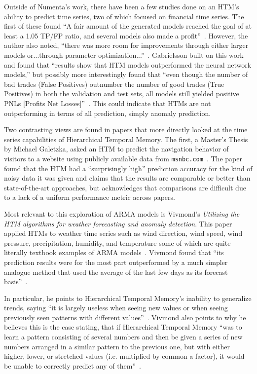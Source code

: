 \documentclass[oneside,12pt,openany]{book}
\begin{document}
	Outside of Numenta's work, there have been a few studies done on an HTM's ability to predict time series, two of which focused on financial time series. The first of these found ``A fair amount of the generated models reached the goal of at least a 1.05 TP/FP ratio, and several models also made a profit''~\cite{Evaluation}. However, the author also noted, ``there was more room for improvements through either larger models or...through parameter optimization...''~\cite{Evaluation}. Gabrielsson built on this work and found that ``results show that HTM models outperformed the neural network models,'' but possibly more interestingly found that ``even though the number of bad trades (False Positives) outnumber the number of good trades (True Positives) in both the validation and test sets, all models still yielded positive PNLs [Profits Net Losses]''~\cite{EvolvingTrading}. This could indicate that HTMs are not outperforming in terms of all prediction, simply anomaly prediction.
	
	Two contrasting views are found in papers that more directly looked at the time series capabilities of Hierarchical Temporal Memory. The first, a Master's Thesis by Michael Galetzka, asked an HTM to predict the navigation behavior of visitors to a website using publicly available data from \texttt{msnbc.com}~\cite{Galetzka}. The paper found that the HTM had a ``surprisingly high'' prediction accuracy for the kind of noisy data it was given and claims that the results are comparable or better than state-of-the-art approaches, but acknowledges that comparisons are difficult due to a lack of a uniform performance metric across papers.
	
	Most relevant to this exploration of ARMA models is Vivmond's \textit{Utilizing the HTM algorithms for weather forecasting and anomaly detection}. This paper applied HTMs to weather time series such as wind direction, wind speed, wind pressure, precipitation, humidity, and temperature some of which are quite literally textbook examples of ARMA models~\cite{Box,WeatherForecast}. Vivmond found that ``its prediction results were for the most part outperformed by a much simpler analogue method that used the average of the last few days as its forecast basis''~\cite{WeatherForecast}. 
	
	In particular, he points to Hierarchical Temporal Memory's inability to generalize trends, saying ``it is largely useless when seeing new values or when seeing previously seen patterns with different values''~\cite{WeatherForecast}. Vivmond also points to why he believes this is the case stating, that if Hierarchical Temporal Memory ``was to learn a pattern consisting of several numbers and then be given a series of new numbers arranged in a similar pattern to the previous one, but with either higher, lower, or stretched values (i.e. multiplied by common a factor), it would be unable to correctly predict any of them''~\cite{WeatherForecast}. 
	
\end{document}
